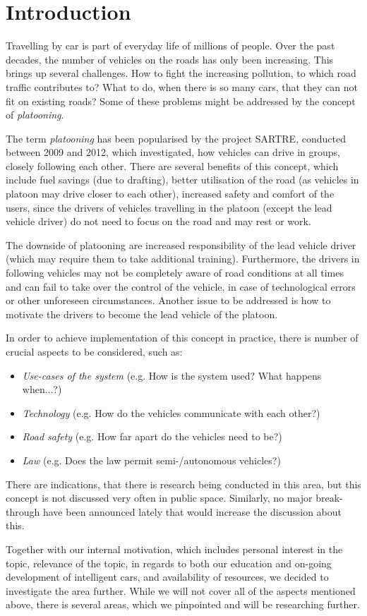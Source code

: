 \section{Introduction}
% 
Travelling by car is part of everyday life of millions of people. Over the past decades, the number of vehicles on the roads has only been increasing. This brings up several challenges. How to fight the increasing pollution, to which road traffic contributes to? What to do, when there is so many cars, that they can not fit on existing roads? Some of these problems might be addressed by the concept of \emph{platooning}.\par
% 
The term \emph{platooning} has been popularised by the project SARTRE, conducted between 2009 and 2012, which investigated, how vehicles can drive in groups, closely following each other. There are several benefits of this concept, which include fuel savings (due to drafting\footnotemark[1]), better utilisation of the road (as vehicles in platoon may drive closer to each other), increased safety and comfort of the users, since the drivers of vehicles travelling in the platoon (except the lead vehicle driver) do not need to focus on the road and may rest or work.\par
% 
The downside of platooning are increased responsibility of the lead vehicle driver (which may require them to take additional training). Furthermore, the drivers in following vehicles may not be completely aware of road conditions at all times and can fail to take over the control of the vehicle, in case of technological errors or other unforeseen circumstances. Another issue to be addressed is how to motivate the drivers to become the lead vehicle of the platoon.\par
% 
In order to achieve implementation of this concept in practice, there is number of crucial aspects to be considered, such as:
\begin{itemize}[noitemsep]
    \item \emph{Use-cases of the system} (e.g. How is the system used? What happens when...?)
    \item \emph{Technology} (e.g. How do the vehicles communicate with each other?)
    \item \emph{Road safety} (e.g. How far apart do the vehicles need to be?)
    \item \emph{Law} (e.g. Does the law permit semi-/autonomous vehicles?)
\end{itemize} \par
% 
There are indications, that there is research being conducted in this area, but this concept is not discussed very often in public space. Similarly, no major break-through have been announced lately that would increase the discussion about this.\par
% 
Together with our internal motivation, which includes personal interest in the topic, relevance of the topic, in regards to both our education and on-going development of intelligent cars, and availability of resources, we decided to investigate the area further. While we will not cover all of the aspects mentioned above, there is several areas, which we pinpointed and will be researching further.\par
